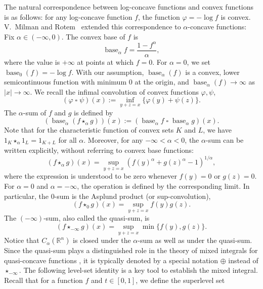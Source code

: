 \documentclass[11pt]{amsart}
\theoremstyle{plain}
\theoremstyle{definition}
\theoremstyle{remark}
\begin{document}
The natural correspondence between log-concave functions and convex functions is as follows: for any log-concave function \( f \),
the function \( \varphi = -\log f \) is convex.
V.~Milman and Rotem~\cite{MR-13} extended this correspondence to \( \alpha \)-concave functions: Fix $ \alpha \in (-\infty, 0) $. The convex base of \( f \) is
\[
    \operatorname{base}_\alpha f = \frac{1 - f^\alpha}{\alpha},
\]
where the value  is $+ \infty$ at points at which $ f = 0$. For $\alpha = 0$, we set $\operatorname{base}_0(f) = - \log f$.
With our assumption, $\operatorname{base}_\alpha(f)$ is a convex, lower semicontinuous function with minimum 0 at the origin, and $\operatorname{base}_\alpha(f) \rightarrow \infty$ as $|x| \rightarrow \infty$.
We recall the infimal convolution of convex functions $\varphi, \psi$,
\[
    (\varphi \mathbin\square \psi)(x):=\inf _{y+z=x}\{\varphi(y)+\psi(z)\}.
\]
The \( \alpha \)-sum of $ f $ and $ g $ is defined by
\begin{equation}
    \label{def:alpha-sum-original}
    (\operatorname{base}_\alpha\left(f \star_\alpha g\right)) (x) :=  (\operatorname{base}_\alpha f \mathbin\square \operatorname{base}_\alpha g) (x) .
\end{equation}
Note that for the characteristic function of convex sets $K$ and $L$, we have $1_K \star_\alpha 1_L = 1_{K+L}$ for all $\alpha$.
Moreover, for any \( -\infty < \alpha < 0 \), the \( \alpha \)-sum can be written explicitly, without referring to convex base functions:
\begin{equation}
\label{eq:explicit-form-some-alpha-sum}
    (f \star_\alpha g) (x) = \sup_{ y +z =x } (f(y)^\alpha + g(z)^\alpha -1)^{1/\alpha},
\end{equation}
where the expression is understood to be zero whenever $f(y)=0$ or $g(z)=0$.
For $\alpha=0 $ and $\alpha = -\infty$, the operation is defined by the corresponding limit. In particular, the $0 $-sum is the Asplund product (or sup-convolution),
\begin{equation}
    \label{def:asplund-sum}
    (f \star_0 g) (x) = \sup_{y+z = x} f(y) g(z).
\end{equation}
The $(-\infty)$-sum, also called the quasi-sum, is
\[
    (f \star_{-\infty} g) (x) = \sup_{y+z = x} \min \{ f(y), g(z) \}.
\]
Notice that $C_\alpha(\mathbb{R}^n)$ is closed under the $\alpha$-sum as well as under the quasi-sum.
Since the quasi-sum plays a distinguished role in the theory of mixed integrals for quasi-concave functions \cite{MR-12}, it is typically denoted by a special notation $\oplus$ instead of $\star_{-\infty}$. The following level-set identity is a key tool to establish the mixed integral. Recall that for a function $f$ and $t\in[0,1]$, we define the superlevel set
\end{document}
